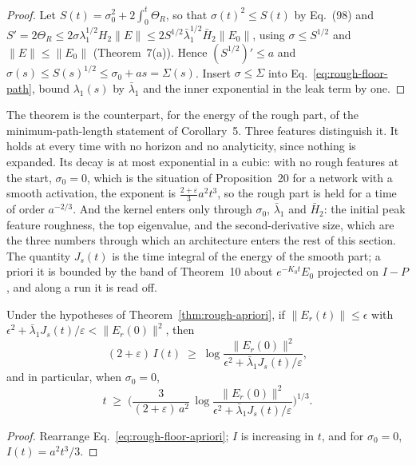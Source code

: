 \begin{proof}
Let $S(t)=\sigma_0^2+2\int_0^t\Theta_R$, so that $\sigma(t)^2\le S(t)$ by
Eq.~(98) and $S'=2\Theta_R\le 2\sigma\lambda_1^{1/2}H_2\|E\|\le 2S^{1/2}\bar\lambda_1^{1/2}\bar H_2\|E_0\|$,
using $\sigma\le S^{1/2}$ and $\|E\|\le\|E_0\|$ (Theorem~7(a)). Hence
$(S^{1/2})'\le a$ and $\sigma(s)\le S(s)^{1/2}\le\sigma_0+as=\Sigma(s)$.
Insert $\sigma\le\Sigma$ into Eq.~\eqref{eq:rough-floor-path}, bound
$\lambda_1(s)$ by $\bar\lambda_1$ and the inner exponential in the leak term
by one.
\end{proof}

The theorem is the counterpart, for the energy of the rough part, of the
minimum-path-length statement of Corollary~5. Three features distinguish it.
It holds at every time with no horizon and no analyticity, since nothing is
expanded. Its decay is at most exponential in a cubic: with no rough features
at the start, $\sigma_0=0$, which is the situation of Proposition~20 for a
network with a smooth activation, the exponent is $\frac{2+\varepsilon}{3}a^2t^3$,
so the rough part is held for a time of order $a^{-2/3}$. And the kernel
enters only through $\sigma_0$, $\bar\lambda_1$ and $\bar H_2$: the
initial peak feature roughness, the top eigenvalue, and the second-derivative
size, which are the three numbers through which an architecture enters the
rest of this section. The quantity $J_s(t)$ is the time integral of the energy
of the smooth part; a priori it is bounded by the band of Theorem~10 about
$e^{-K_0t}E_0$ projected on $I-P$, and along a run it is read off.

\begin{corollary}
\label{cor:min-time-rough}
Under the hypotheses of Theorem~\ref{thm:rough-apriori}, if $\|E_r(t)\|\le\epsilon$
with $\epsilon^2+\bar\lambda_1J_s(t)/\varepsilon<\|E_r(0)\|^2$, then
\begin{equation}
(2+\varepsilon)\,I(t) \;\ge\; \log\frac{\|E_r(0)\|^2}{\epsilon^2+\bar\lambda_1 J_s(t)/\varepsilon},
\label{eq:min-time-rough}
\end{equation}
and in particular, when $\sigma_0=0$,
\begin{equation}
t \;\ge\; \Big(\frac{3}{(2+\varepsilon)\,a^2}\,
\log\frac{\|E_r(0)\|^2}{\epsilon^2+\bar\lambda_1 J_s(t)/\varepsilon}\Big)^{1/3} .
\label{eq:cube-root}
\end{equation}
\end{corollary}

\begin{proof}
Rearrange Eq.~\eqref{eq:rough-floor-apriori}; $I$ is increasing in $t$, and
for $\sigma_0=0$, $I(t)=a^2t^3/3$.
\end{proof}

